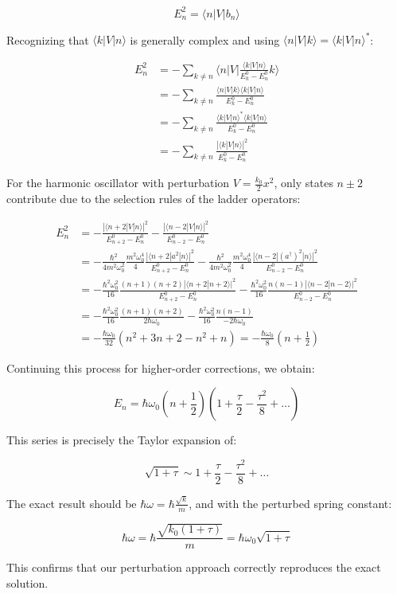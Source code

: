 \begin{equation}
E_n^2=\langle n|V|b_n\rangle
\end{equation}

Recognizing that $\langle k|V|n\rangle$ is generally complex and using $\langle n|V|k\rangle=\langle k|V|n\rangle^*$:

\begin{align}
E_n^2&=-\sum_{k\neq n}\langle n|V|\frac{\langle k|V|n\rangle}{E_k^0-E_n^0}k\rangle\\
&=-\sum_{k\neq n}\frac{\langle n|V|k\rangle\langle k|V|n\rangle}{E_k^0-E_n^0}\\
&=-\sum_{k\neq n}\frac{\langle k|V|n\rangle^*\langle k|V|n\rangle}{E_k^0-E_n^0} \\
&=-\sum_{k\neq n}\frac{|\langle k|V|n\rangle|^2}{E_k^0-E_n^0}
\end{align}

For the harmonic oscillator with perturbation $V=\frac{k_0}{2}x^2$, only states $n\pm 2$ contribute due to the selection rules of the ladder operators:

\begin{align}
E_n^2&=-\frac{|\langle n+2|V|n\rangle|^2}{E_{n+2}^0-E_n^0}-\frac{|\langle n-2|V|n\rangle|^2}{E_{n-2}^0-E_n^0}\\
&=-\frac{\hbar^2}{4m^2\omega_0^2}\frac{m^2\omega_0^4}{4}\frac{|\langle n+2|a^2|n\rangle|^2}{E_{n+2}^0-E_n^0}-\frac{\hbar^2}{4m^2\omega_0^2}\frac{m^2\omega_0^4}{4}\frac{|\langle n-2|(a^\dagger)^2|n\rangle|^2}{E_{n-2}^0-E_n^0}\\
&=-\frac{\hbar^2\omega_0^2}{16}\frac{(n+1)(n+2)|\langle n+2|n+2\rangle|^2}{E_{n+2}^0-E_n^0}-\frac{\hbar^2\omega_0^2}{16}\frac{n(n-1)|\langle n-2|n-2\rangle|^2}{E_{n-2}^0-E_n^0}\\
&=-\frac{\hbar^2\omega_0^2}{16}\frac{(n+1)(n+2)}{2\hbar\omega_0}-\frac{\hbar^2\omega_0^2}{16}\frac{n(n-1)}{-2\hbar\omega_0}\\
&=-\frac{\hbar\omega_0}{32}(n^2+3n+2-n^2+n)=-\frac{\hbar\omega_0}{8}(n+\frac{1}{2})
\end{align}

Continuing this process for higher-order corrections, we obtain:

\begin{equation}
E_n=\hbar\omega_0(n+\frac{1}{2})(1+\frac{\tau}{2}-\frac{\tau^2}{8}+\ldots)
\end{equation}

This series is precisely the Taylor expansion of:

\begin{equation}
\sqrt{1+\tau}\sim 1+\frac{\tau}{2}-\frac{\tau^2}{8}+\ldots
\end{equation}

The exact result should be $\hbar\omega=\hbar\frac{\sqrt{k}}{m}$, and with the perturbed spring constant:

\begin{equation}
\hbar\omega=\hbar\frac{\sqrt{k_0(1+\tau)}}{m}=\hbar\omega_0\sqrt{1+\tau}
\end{equation}

This confirms that our perturbation approach correctly reproduces the exact solution.
